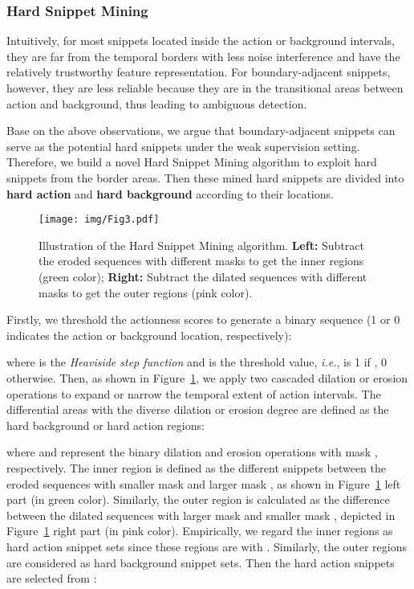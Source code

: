 \documentclass[final]{cvpr}
\begin{document}
\subsubsection{Hard Snippet Mining}
\label{subsubsec:hardsampleSelect}
Intuitively, for most snippets located inside the action or background intervals, they are far from the temporal borders with less noise interference and have the relatively trustworthy feature representation. For boundary-adjacent snippets, however, they are less reliable because they are in the transitional areas between action and background, thus leading to ambiguous detection.

Base on the above observations, we argue that boundary-adjacent snippets can serve as the potential hard snippets under the weak supervision setting. Therefore, we build a novel Hard Snippet Mining algorithm to exploit hard snippets from the border areas. Then these mined hard snippets are divided into \textbf{hard action} and \textbf{hard background} according to their locations.

\begin{figure}[t]
\begin{center}
\texttt{[image: img/Fig3.pdf]}
\end{center}
   \caption{Illustration of the Hard Snippet Mining algorithm. \textbf{Left:} Subtract the eroded sequences with different masks to get the inner regions (green color); \textbf{Right:} Subtract the dilated sequences with different masks to get the outer regions (pink color). 
   }
\label{fig:pseudo_context_loc}
\end{figure}

Firstly, we threshold the actionness scores to generate a binary sequence (1 or 0 indicates the action or background location, respectively):

\noindent where  is the \emph{Heaviside step function} and  is the threshold value, \emph{i.e.},  is 1 if , 0 otherwise. Then, as shown in Figure~\ref{fig:pseudo_context_loc}, we apply two cascaded dilation or erosion operations to expand or narrow the temporal extent of action intervals. The differential areas with the diverse dilation or erosion degree are defined as the hard background or hard action regions: 


\noindent where  and  represent the binary dilation and erosion operations with mask , respectively. The inner region  is defined as the different snippets between the eroded sequences with smaller mask  and larger mask , as shown in Figure~\ref{fig:pseudo_context_loc} left part (in green color). Similarly, the outer region  is calculated as the difference between the dilated sequences with larger mask  and smaller mask , depicted in Figure~\ref{fig:pseudo_context_loc} right part (in pink color). 
Empirically, we regard the inner regions  as hard action snippet sets since these regions are with . Similarly, the outer regions  are considered as hard background snippet sets. Then the hard action snippets  are selected from :
\end{document}
